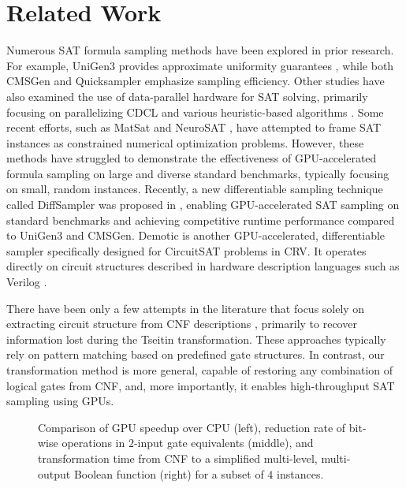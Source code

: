 \vspace{-0.2cm}
\section{Related Work}

Numerous SAT formula sampling methods have been explored in prior research. For example, {\sc UniGen3} provides approximate uniformity guarantees \cite{yash2022barbarik}, while both {\sc CMSGen} and {\sc Quicksampler} \cite{dutra2018quicksampler} emphasize sampling efficiency. Other studies have also examined the use of data-parallel hardware for SAT solving, primarily focusing on parallelizing CDCL and various heuristic-based algorithms \cite{costa2013parallelization, osama2021sat}. Some recent efforts, such as {\sc MatSat} \cite{sato2021matsat} and {\sc NeuroSAT} \cite{amizadeh2018learning}, have attempted to frame SAT instances as constrained numerical optimization problems. However, these methods have struggled to demonstrate the effectiveness of GPU-accelerated formula sampling on large and diverse standard benchmarks, typically focusing on small, random instances. Recently, a new differentiable sampling technique called {\sc DiffSampler} was proposed in \cite{Ardakani2024diffsampler}, enabling GPU-accelerated SAT sampling on standard benchmarks and achieving competitive runtime performance compared to {\sc UniGen3} and {\sc CMSGen}. {\sc Demotic} is another GPU-accelerated, differentiable sampler specifically designed for CircuitSAT problems in CRV. It operates directly on circuit structures described in hardware description languages such as Verilog \cite{Ardakani2025Demotic}.

There have been only a few attempts in the literature that focus solely on extracting circuit structure from CNF descriptions \cite{Fu2007ExtractingLC, roy2004restoring}, primarily to recover information lost during the Tseitin transformation. These approaches typically rely on pattern matching based on predefined gate structures. In contrast, our transformation method is more general, capable of restoring any combination of logical gates from CNF, and, more importantly, it enables high-throughput SAT sampling using GPUs.

\begin{figure}[t]
    \centering
    \scalebox{0.85}{
    }
    \caption{Comparison of GPU speedup over CPU (left), reduction rate of bit-wise operations in $2$-input gate equivalents (middle), and transformation time from CNF to a simplified multi-level, multi-output Boolean function (right) for a subset of $4$ instances.}
    \label{fig5}
    \vspace{-0.3cm}
\end{figure}